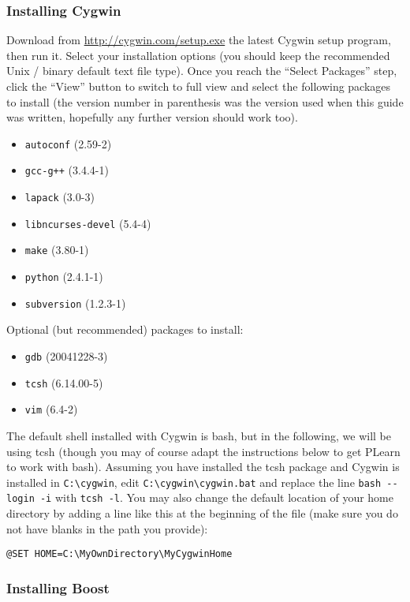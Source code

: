 \documentclass[11pt]{book}
\begin{document}
\subsubsection{Installing Cygwin}

Download from \url{http://cygwin.com/setup.exe} the latest Cygwin setup program,
then run it.
Select your installation options (you should keep the recommended Unix / binary default
text file type).
Once you reach the ``Select Packages'' step, click the ``View'' button to switch
to full view and select the following packages to install (the version number in
parenthesis was the version used when this guide was written, hopefully any further
version should work too).

\begin{itemize}
\item \verb!autoconf! (2.59-2)
\item \verb!gcc-g++! (3.4.4-1)
\item \verb!lapack! (3.0-3)
\item \verb!libncurses-devel! (5.4-4)
\item \verb!make! (3.80-1)
\item \verb!python! (2.4.1-1)
\item \verb!subversion! (1.2.3-1)
\end{itemize}

Optional (but recommended) packages to install:
\begin{itemize}
\item \verb!gdb! (20041228-3)
\item \verb!tcsh! (6.14.00-5)
\item \verb!vim! (6.4-2)
\end{itemize}

The default shell installed with Cygwin is bash, but in the following, we will
be using tcsh (though you may of course adapt the instructions below to get PLearn to
work with bash). Assuming you have installed the tcsh package and Cygwin is
installed in \verb!C:\cygwin!, edit \verb!C:\cygwin\cygwin.bat! and replace
the line \verb!bash --login -i! with \verb!tcsh -l!.
You may also change the default location of your home directory by adding a
line like this at the beginning of the file (make sure you do not have blanks
in the path you provide):
\begin{verbatim}
@SET HOME=C:\MyOwnDirectory\MyCygwinHome
\end{verbatim}


\subsubsection{Installing Boost}
\end{document}
